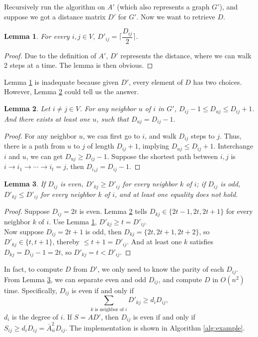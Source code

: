 \documentclass[11pt]{article}
\theoremstyle{plain}
\newtheorem{lemma}{Lemma}[section]
\begin{document}
Recursively run the algorithm on $A'$ (which also represents a graph $G'$), and suppose we got a distance matrix $D'$ for $G'$. Now we want to retrieve $D$.

\begin{lemma}
\label{2}
For every $i,j\in V$, $D'_{ij}=\lceil\dfrac{D_{ij}}{2}\rceil$.
\end{lemma}
\begin{proof}
Due to the definition of $A'$, $D'$ represents the distance, where we can walk 2 steps at a time. The lemma is then obvious.
\end{proof}

Lemma \ref{2} is inadequate because given $D'$, every element of $D$ has two choices. However, Lemma \ref{3} could tell us the answer.
\begin{lemma}
\label{3}
Let $i\not=j \in V$. For any neighbor $u$ of $i$ in $G'$, $D_{ij}-1\le D_{uj}\le D_{ij}+1$. And there exists at least one $u$, such that $D_{uj}=D_{ij}-1$.
\end{lemma}
\begin{proof}
For any neighbor $u$, we can first go to $i$, and walk $D_{ij}$ steps to $j$. Thus, there is a path from $u$ to $j$ of length $D_{ij}+1$, implying $D_{uj}\le D_{ij}+1$. Interchange $i$ and $u$, we can get $D_{uj}\ge D_{ij}-1$. Suppose the shortest path between $i,j$ is $i\to i_1\to\cdots\to i_t=j$, then $D_{i_1j}=D_{ij}-1$.
\end{proof}

\begin{lemma}
\label{4}
If $D_{ij}$ is even, $D'_{kj}\ge D'_{ij}$ for every neighbor $k$ of $i$; if $D_{ij}$ is odd, $D'_{kj}\le D'_{ij}$ for every neighbor $k$ of $i$, and at least one equality does not hold.
\end{lemma}
\begin{proof}
Suppose $D_{ij}=2t$ is even. Lemma \ref{3} tells $D_{kj}\in\{2t-1,2t,2t+1\}$ for every neighbor $k$ of $i$. Use Lemma \ref{2}, $D'_{kj}\ge t=D'_{ij}$. \\
Now suppose $D_{ij}=2t+1$ is odd, then $D_{kj}=\{2t,2t+1,2t+2\}$, so $D'_{kj}\in \{t,t+1\}$, thereby $\le t+1=D'_{ij}$. And at least one $k$ satisfies $D_{kj}=D_{ij}-1=2t$, so $D'_{kj}=t<D'_{ij}$.
\end{proof}

In fact, to compute $D$ from $D'$, we only need to know the parity of each $D_{ij}$. From Lemma \ref{4}, we can separate even and odd $D_{ij}$, and compute $D$ in $O(n^2)$ time. Specifically, $D_{ij}$ is even if and only if
$$\sum\limits_{k\text{ is neighbor of }i} D'_{kj}\ge d_iD_{ij},$$
$d_i$ is the degree of $i$. If $S=AD'$, then $D_{ij}$ is even if and only if $S_{ij}\ge d_iD_{ij}=\bar A^2_{ii}D_{ij}$. The implementation is shown in Algorithm \ref{alg:example}.
\end{document}
